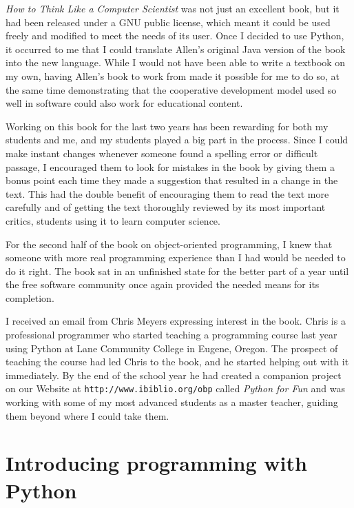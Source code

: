 {\em How to Think Like a Computer Scientist} was not just an excellent
book, but it had been released under a GNU public license, which meant
it could be used freely and modified to meet the needs of its user.
Once I decided to use Python, it occurred to me that I could translate
Allen's original Java version of the book into the new language.
While I would not have been able to write a textbook on my own, having
Allen's book to work from made it possible for me to do so, at the
same time demonstrating that the cooperative development model used so
well in software could also work for educational content.

Working on this book for the last two years has been rewarding for
both my students and me, and my students played a big part in the
process. Since I could make instant changes whenever someone found a
spelling error or difficult passage, I encouraged them to look for
mistakes in the book by giving them a bonus point each time they made
a suggestion that resulted in a change in the text. This had the
double benefit of encouraging them to read the text more carefully and
of getting the text thoroughly reviewed by its most important critics,
students using it to learn computer science.


For the second half of the book on object-oriented programming, I knew
that someone with more real programming experience than I had would be
needed to do it right.  The book sat in an unfinished state for the better
part of a year until the free software community once again provided the
needed means for its completion.

I received an email from Chris Meyers expressing interest in the book.
Chris is a professional programmer who started teaching a programming
course last year using Python at Lane Community College in Eugene,
Oregon.  The prospect of teaching the course had led Chris to the
book, and he started helping out with it immediately.  By the end of
the school year he had created a companion project on our Website at
{\tt http://www.ibiblio.org/obp} called {\em Python for Fun} and was
working with some of my most advanced students as a master teacher,
guiding them beyond where I could take them.


\section*{Introducing programming with Python}

